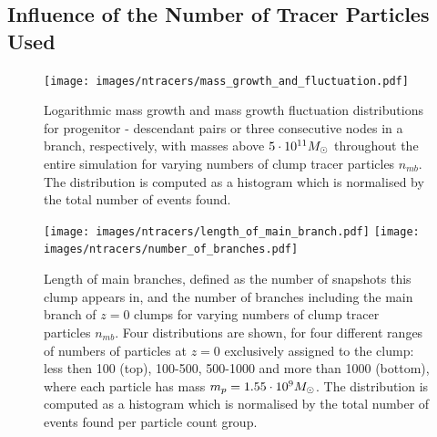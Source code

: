 	













\subsection{Influence of the Number of Tracer Particles Used}




\begin{figure}[H]
	\centering
	\texttt{[image: images/ntracers/mass\_growth\_and\_fluctuation.pdf]}%
	\caption{
		Logarithmic mass growth and mass growth fluctuation distributions for progenitor - descendant pairs or three consecutive nodes in a branch, respectively, with masses above $5\cdot 10^{11}M_\odot$ throughout the entire simulation for varying numbers of clump tracer particles $n_{mb}$.
		The distribution is computed as a histogram which is normalised by the total number of events found.
	}%
	\label{fig:ntracers_masses}
\end{figure}

\begin{figure}[p]
	\centering
	\centering
	\texttt{[image: images/ntracers/length\_of\_main\_branch.pdf]}
	\endminipage%
	\hspace*{\fill}
	\centering
	\texttt{[image: images/ntracers/number\_of\_branches.pdf]}%
	\endminipage%
	\caption{
		Length of main branches, defined as the number of snapshots this clump appears in, and the number of branches including the main branch of $z=0$ clumps for varying numbers of clump tracer particles $n_{mb}$.
		Four distributions are shown, for four different ranges of numbers of particles at $z=0$ exclusively assigned to the clump: less then 100 (top), 100-500, 500-1000 and more than 1000 (bottom), where each particle has mass $m_p = 1.55 \cdot 10^9 M_\odot$.
		The distribution is computed as a histogram which is normalised by the total number of events found per particle count group.
	}%
	\label{fig:ntracers_mbl_nbranch}
\end{figure}













